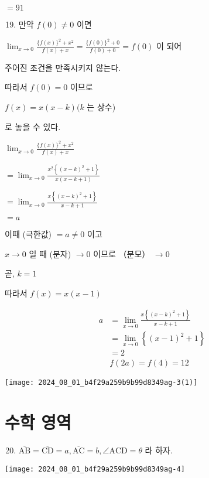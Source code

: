 \documentclass[10pt]{article}
\begin{document}
$=91$

\begin{enumerate}
  \setcounter{enumi}{18}
  \item 만약 $f(0) \neq 0$ 이면
\end{enumerate}

$\lim _{x \rightarrow 0} \frac{\{f(x)\}^{2}+x^{2}}{f(x)+x}=\frac{\{f(0)\}^{2}+0}{f(0)+0}=f(0)$ 이 되어

주어진 조건을 만족시키지 않는다.

따라서 $f(0)=0$ 이므로

$f(x)=x(x-k)(k$ 는 상수)

로 놓을 수 있다.

$\lim _{x \rightarrow 0} \frac{\{f(x)\}^{2}+x^{2}}{f(x)+x}$

$=\lim _{x \rightarrow 0} \frac{x^{2}\left\{(x-k)^{2}+1\right\}}{x(x-k+1)}$

$=\lim _{x \rightarrow 0} \frac{x\left\{(x-k)^{2}+1\right\}}{x-k+1}$

$=a$

이때 (극한값) $=a \neq 0$ 이고

$x \rightarrow 0$ 일 때 (분자) $\rightarrow 0$ 이므로 （분모） $\rightarrow 0$

곧, $k=1$

따라서 $f(x)=x(x-1)$

\[
\begin{aligned}
a & =\lim _{x \rightarrow 0} \frac{x\left\{(x-k)^{2}+1\right\}}{x-k+1} \\
& =\lim _{x \rightarrow 0}\left\{(x-1)^{2}+1\right\} \\
& =2 \\
& f(2 a)=f(4)=12
\end{aligned}
\]

\begin{center}
\texttt{[image: 2024\_08\_01\_b4f29a259b9b99d8349ag-3(1)]}
\end{center}

\section*{수학 영역}
\begin{enumerate}
  \setcounter{enumi}{19}
  \item $\overline{\mathrm{AB}}=\overline{\mathrm{CD}}=a, \overline{\mathrm{AC}}=b, \angle \mathrm{ACD}=\theta$ 라 하자.
\end{enumerate}

\begin{center}
\texttt{[image: 2024\_08\_01\_b4f29a259b9b99d8349ag-4]}
\end{center}
\end{document}
